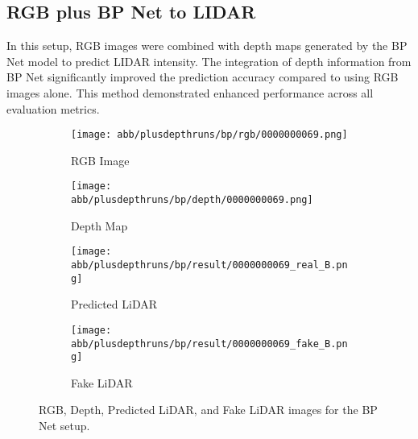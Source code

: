 \subsection{RGB plus BP Net to LIDAR}
In this setup, RGB images were combined with depth maps generated by the BP Net model to predict LIDAR intensity. The integration of depth information from BP Net significantly improved the prediction accuracy compared to using RGB images alone. This method demonstrated enhanced performance across all evaluation metrics.
\begin{figure}[!ht]
	\centering
	\begin{subfigure}{0.4\textwidth}
		\centering
		\texttt{[image: abb/plusdepthruns/bp/rgb/0000000069.png]}
		\caption{RGB Image}
		\label{fig:bp_rgb}
	\end{subfigure}
	
	\vspace{1em} %
	
	\begin{subfigure}{0.4\textwidth}
		\centering
		\texttt{[image: abb/plusdepthruns/bp/depth/0000000069.png]}
		\caption{Depth Map}
		\label{fig:bp_depth}
	\end{subfigure}
	
	\vspace{1em} %
	
	\begin{subfigure}{0.25\textwidth}
		\centering
		\texttt{[image: abb/plusdepthruns/bp/result/0000000069\_real\_B.png]}
		\caption{Predicted LiDAR}
		\label{fig:bp_pred_lidar}
	\end{subfigure}
	\begin{subfigure}{0.25\textwidth}
		\centering
		\texttt{[image: abb/plusdepthruns/bp/result/0000000069\_fake\_B.png]}
		\caption{Fake LiDAR}
		\label{fig:bp_fake_lidar}
	\end{subfigure}
	
	\caption{RGB, Depth, Predicted LiDAR, and Fake LiDAR images for the BP Net setup.}
	\label{fig:bpplusdepth}
\end{figure}

